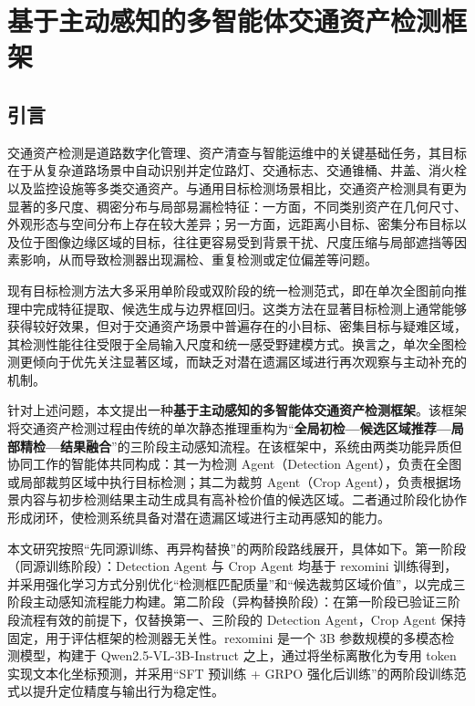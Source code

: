 
\chapter{基于主动感知的多智能体交通资产检测框架}
\label{chap:active_perception_framework}

\section{引言}
\label{sec:active_perception_intro}

交通资产检测是道路数字化管理、资产清查与智能运维中的关键基础任务，其目标在于从复杂道路场景中自动识别并定位路灯、交通标志、交通锥桶、井盖、消火栓以及监控设施等多类交通资产。与通用目标检测场景相比，交通资产检测具有更为显著的多尺度、稠密分布与局部易漏检特征：一方面，不同类别资产在几何尺寸、外观形态与空间分布上存在较大差异；另一方面，远距离小目标、密集分布目标以及位于图像边缘区域的目标，往往更容易受到背景干扰、尺度压缩与局部遮挡等因素影响，从而导致检测器出现漏检、重复检测或定位偏差等问题。

现有目标检测方法大多采用单阶段或双阶段的统一检测范式，即在单次全图前向推理中完成特征提取、候选生成与边界框回归。这类方法在显著目标检测上通常能够获得较好效果，但对于交通资产场景中普遍存在的小目标、密集目标与疑难区域，其检测性能往往受限于全局输入尺度和统一感受野建模方式。换言之，单次全图检测更倾向于优先关注显著区域，而缺乏对潜在遗漏区域进行再次观察与主动补充的机制。

针对上述问题，本文提出一种\textbf{基于主动感知的多智能体交通资产检测框架}。该框架将交通资产检测过程由传统的单次静态推理重构为“\textbf{全局初检—候选区域推荐—局部精检—结果融合}”的三阶段主动感知流程。在该框架中，系统由两类功能异质但协同工作的智能体共同构成：其一为检测 Agent（Detection Agent），负责在全图或局部裁剪区域中执行目标检测；其二为裁剪 Agent（Crop Agent），负责根据场景内容与初步检测结果主动生成具有高补检价值的候选区域。二者通过阶段化协作形成闭环，使检测系统具备对潜在遗漏区域进行主动再感知的能力。

本文研究按照“先同源训练、再异构替换”的两阶段路线展开，具体如下。第一阶段（同源训练阶段）：Detection Agent 与 Crop Agent 均基于 rexomini 训练得到，并采用强化学习方式分别优化“检测框匹配质量”和“候选裁剪区域价值”，以完成三阶段主动感知流程能力构建。第二阶段（异构替换阶段）：在第一阶段已验证三阶段流程有效的前提下，仅替换第一、三阶段的 Detection Agent，Crop Agent 保持固定，用于评估框架的检测器无关性。rexomini 是一个 3B 参数规模的多模态检测模型，构建于 Qwen2.5-VL-3B-Instruct 之上，通过将坐标离散化为专用 token 实现文本化坐标预测，并采用“SFT 预训练 + GRPO 强化后训练”的两阶段训练范式以提升定位精度与输出行为稳定性\cite{rexomni2025}。

